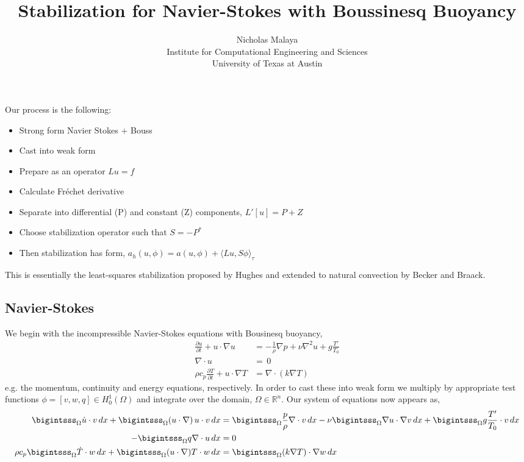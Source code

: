 \documentclass{article}
\title{\bf{Stabilization for Navier-Stokes with Boussinesq Buoyancy}}
\author{Nicholas Malaya \\ Institute for Computational Engineering and Sciences \\ University of Texas at Austin} \date{}
\begin{document}
\maketitle

%
%
Our process is the following: 

\begin{itemize}
 \item Strong form Navier Stokes + Bouss
 \item Cast into weak form
 \item Prepare as an operator $Lu=f$
 \item Calculate Fr\'echet derivative
 \item Separate into differential (P) and constant (Z) components,
       $L'[u] = P + Z$
 \item Choose stabilization operator such that $S = -P^*$
 \item Then stabilization has form, $a_h(u,\phi) = a(u,\phi) + \langle
       Lu,S\phi \rangle_\tau$
\end{itemize}

This is essentially the least-squares stabilization proposed by Hughes
and extended to natural convection by Becker and Braack. 

%
%
\newpage

\subsection{Navier-Stokes}

We begin with the incompressible Navier-Stokes equations with Bousinesq
buoyancy,
\begin{align}
 \frac{\partial u}{\partial t} + u \cdot \nabla u &= -\frac{1}{\rho}
 \nabla p + \nu \nabla^2 u + g \frac{T'}{T_0} \\
 \nabla \cdot u &= \, 0 \\
 \rho c_p \frac{\partial T}{\partial t} + u \cdot \nabla T &= \nabla
 \cdot (k \nabla T)
\end{align}
e.g. the momentum, continuity and energy equations, respectively. In
order to cast these into weak form we multiply by appropriate test
functions $\phi = \left[v,w,q\right] \in H^1_0(\Omega)$ and integrate over
the domain, $\Omega \in \mathbb{R}^n$. Our system of equations now
appears as, 
\begin{align}
 \bigintsss_\Omega \dot u \cdot v \, dx +
 \bigintsss_\Omega  (u \cdot \nabla) \, u \cdot v \, dx &=
 \bigintsss_\Omega \frac{p}{\rho} \nabla \cdot v \, dx - \nu \bigintsss_\Omega \nabla u \cdot \nabla v
 \,dx + \bigintsss_\Omega g \frac{T'}{T_0} \cdot v \, dx \\ 
 - \bigintsss_\Omega q \nabla \cdot u \, dx &= 0 \\
 \rho c_p \bigintsss_\Omega \dot T \cdot w \, dx + \bigintsss_\Omega (u
 \cdot \nabla) T \cdot w \, dx  &= \bigintsss_\Omega (k \nabla T) \cdot
 \nabla w \, dx
\end{align}
\end{document}
